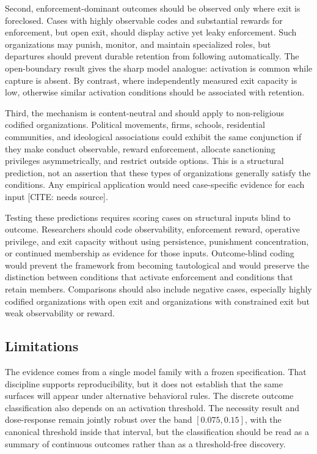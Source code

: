 Second, enforcement-dominant outcomes should be observed only where exit is foreclosed. Cases with highly observable codes and substantial rewards for enforcement, but open exit, should display active yet leaky enforcement. Such organizations may punish, monitor, and maintain specialized roles, but departures should prevent durable retention from following automatically. The open-boundary result gives the sharp model analogue: activation is common while capture is absent. By contrast, where independently measured exit capacity is low, otherwise similar activation conditions should be associated with retention.

Third, the mechanism is content-neutral and should apply to non-religious codified organizations. Political movements, firms, schools, residential communities, and ideological associations could exhibit the same conjunction if they make conduct observable, reward enforcement, allocate sanctioning privileges asymmetrically, and restrict outside options. This is a structural prediction, not an assertion that these types of organizations generally satisfy the conditions. Any empirical application would need case-specific evidence for each input [CITE: needs source].

Testing these predictions requires scoring cases on structural inputs blind to outcome. Researchers should code observability, enforcement reward, operative privilege, and exit capacity without using persistence, punishment concentration, or continued membership as evidence for those inputs. Outcome-blind coding would prevent the framework from becoming tautological and would preserve the distinction between conditions that activate enforcement and conditions that retain members. Comparisons should also include negative cases, especially highly codified organizations with open exit and organizations with constrained exit but weak observability or reward.

\subsection{Limitations}

The evidence comes from a single model family with a frozen specification. That discipline supports reproducibility, but it does not establish that the same surfaces will appear under alternative behavioral rules. The discrete outcome classification also depends on an activation threshold. The necessity result and dose-response remain jointly robust over the band $[0.075,0.15]$, with the canonical threshold inside that interval, but the classification should be read as a summary of continuous outcomes rather than as a threshold-free discovery.

